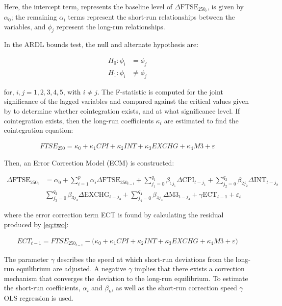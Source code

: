 \documentclass[11pt,a4paper]{article}
\newcommand{\citeboth}[1]{\citeauthor{#1} \citep{#1}}
\begin{document}
Here, the intercept term, represents the baseline level of \(\Delta \text{FTSE}_{250_t}\), is given by $\alpha_0$; the 
remaining $\alpha_i$ terms represent the short-run relationships 
between the variables, and $\phi_j$ represent the long-run relationships. 

In the ARDL bounds test, the null and alternate hypothesis are:
 
\begin{align*}
    H_{0}: \phi_i &= \phi_j\\
    H_{1}: \phi_i &\neq \phi_j
\end{align*}

for, $i,j = 1,2,3,4,5$, with $i\neq j$. The F-statistic is computed for the joint
significance of the lagged variables and compared against the critical values
given by \citeboth{pesaran2001} to determine whether cointegration exists, 
and at what significance level. If cointegration exists, then 
the long-run coefficients $\kappa_i$ are estimated to find the cointegration equation:

\begin{align}
    FTSE_{250} = \kappa_0 + \kappa_1 CPI + \kappa_2 INT + \kappa_3 EXCHG + \kappa_4 M3 + \varepsilon \label{eq:two}
\end{align}

Then, an Error Correction Model (ECM) is constructed:

\begin{align*}
    \Delta \text{FTSE}_{250_t} &= \alpha_0 + \sum_{i=1}^{p} \alpha_i \Delta \text{FTSE}_{250_{t-i}} + \sum_{j_{1}=0}^{q_1} \beta_{1j_{1}} \Delta \text{CPI}_{t-j_{1}} + \sum_{j_{2}=0}^{q_2} \beta_{2j_{2}} \Delta \text{INT}_{t-j_{2}} \\
                               & \sum_{j_{3}=0}^{q_3} \beta_{3j_{3}} \Delta \text{EXCHG}_{t-j_{3}} + \sum_{j_{4}=0}^{q_4} \beta_{4j_{4}} \Delta \text{M3}_{t-j_{4}} + \gamma\text{ECT}_{t-1} + \varepsilon_t
\end{align*}

where the error correction term ECT is found by calculating the residual 
produced by \eqref{eq:two}:

\begin{align*}
    ECT_{t-1} = FTSE_{250_{t-1}} - \biggl(\kappa_0 + \kappa_1 CPI + \kappa_2 INT + \kappa_3 EXCHG + \kappa_4 M3 + \varepsilon \biggr)
\end{align*}

The parameter $\gamma$ describes the speed at which short-run deviations from the long-run equilibrium
are adjusted. A negative $\gamma$ implies that there exists a correction mechanism that converges the deviation 
to the long-run equilibrium. To estimate the short-run coefficients, $\alpha_i$ and $\beta_k$, as 
well as the short-run correction speed $\gamma$ OLS regression is used.
\end{document}
